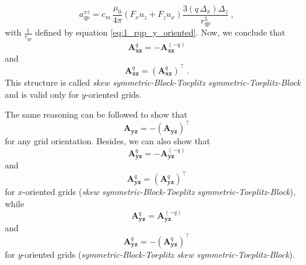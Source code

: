 \documentclass[manuscript]{geophysics}
\begin{document}
	\begin{equation}
		a^{xz}_{qp} = c_{m} \, \frac{\mu_{0}}{4\pi} 
		\left( F_{x} u_{z} + F_{z} u_{x} \right) \frac{3 \left( q \, \Delta_{x} \right) \Delta_{z}}{r_{qp}^{5}} \: ,
		\label{eq:aqp_xz_y_oriented}
	\end{equation}
	with $\tfrac{1}{r_{qp}}$ defined by equation \ref{eq:1_rqp_y_oriented}.
	Now, we conclude that
	\begin{equation}
		\mathbf{A}_{\boldsymbol{xz}}^{q} = -\mathbf{A}_{\boldsymbol{xz}}^{(-q)}
		\label{eq:Axz_q_external_block_symmetry_y_oriented}
	\end{equation}
	and 
	\begin{equation}
		\mathbf{A}_{\boldsymbol{xz}}^{q} = \left( \mathbf{A}_{\boldsymbol{xz}}^{q} \right)^{\top} \: .
		\label{eq:Axz_q_internal_block_symmetry_y_oriented}
	\end{equation}
	This structure is called \textit{skew symmetric-Block-Toeplitz symmetric-Toeplitz-Block} and is 
	valid only for $y$-oriented grids.
	
	The same reasoning can be followed to show that
	\begin{equation}
		\mathbf{A}_{\boldsymbol{yz}} = -\left( \mathbf{A}_{\boldsymbol{yz}} \right)^{\top}
		\label{eq:Ayz_symmetry}
	\end{equation} 
	for any grid orientation. Besides, we can also show that
	\begin{equation}
		\mathbf{A}_{\boldsymbol{yz}}^{q} = -\mathbf{A}_{\boldsymbol{yz}}^{(-q)}
		\label{eq:Ayz_q_external_block_symmetry_x_oriented}
	\end{equation}
	and 
	\begin{equation}
		\mathbf{A}_{\boldsymbol{yz}}^{q} = \left( \mathbf{A}_{\boldsymbol{yz}}^{q} \right)^{\top}
		\label{eq:Ayz_q_internal_block_symmetry_x_oriented}
	\end{equation}
	for $x$-oriented grids (\textit{skew symmetric-Block-Toeplitz symmetric-Toeplitz-Block}), while
	\begin{equation}
		\mathbf{A}_{\boldsymbol{yz}}^{q} = \mathbf{A}_{\boldsymbol{yz}}^{(-q)}
		\label{eq:Ayz_q_external_block_symmetry_y_oriented}
	\end{equation}
	and 
	\begin{equation}
		\mathbf{A}_{\boldsymbol{yz}}^{q} = -\left( \mathbf{A}_{\boldsymbol{yz}}^{q} \right)^{\top}
		\label{eq:Ayz_q_internal_block_symmetry_y_oriented}
	\end{equation}
	for $y$-oriented grids (\textit{symmetric-Block-Toeplitz skew symmetric-Toeplitz-Block}).
	
\end{document}
